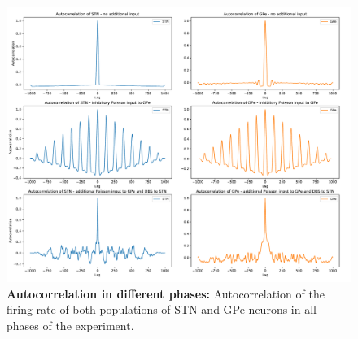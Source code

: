 \documentclass[11pt]{article}
\begin{document}
\begin{figure}[tb]
    \centering
    \includegraphics[width=\textwidth]{images/autocorrelation.pdf}
    \caption{\textbf{Autocorrelation in different phases:} 
    Autocorrelation of the firing rate of both populations of STN and GPe neurons in
    all phases of the experiment.}
    \label{fig:autocorrelation}
\end{figure}
\end{document}
